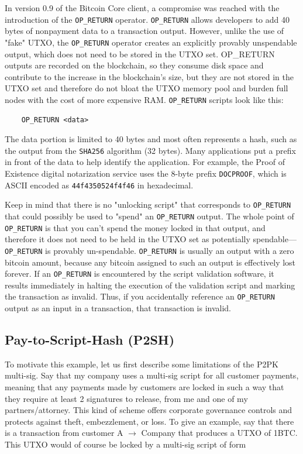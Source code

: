 \documentclass{article}
\newcounter{example}[section]
\newcounter{algo}[section]
\newcounter{code}[section]
\begin{document}
    In version 0.9 of the Bitcoin Core client, a compromise was reached with the introduction of the \texttt{OP\_RETURN} operator. \texttt{OP\_RETURN} allows developers to add 40 bytes of nonpayment data to a transaction output. However, unlike the use of "fake" UTXO, the \texttt{OP\_RETURN} operator creates an explicitly provably unspendable output, which does not need to be stored in the UTXO set. OP\_RETURN outputs are recorded on the blockchain, so they consume disk space and contribute to the increase in the blockchain's size, but they are not stored in the UTXO set and therefore do not bloat the UTXO memory pool and burden full nodes with the cost of more expensive RAM. \texttt{OP\_RETURN} scripts look like this:

    \begin{lstlisting}
    OP_RETURN <data>
    \end{lstlisting}

    The data portion is limited to 40 bytes and most often represents a hash, such as the output from the \texttt{SHA256} algorithm (32 bytes). Many applications put a prefix in front of the data to help identify the application. For example, the Proof of Existence digital notarization service uses the 8-byte prefix \texttt{DOCPROOF}, which is ASCII encoded as \texttt{44f4350524f4f46} in hexadecimal.

    Keep in mind that there is no "unlocking script" that corresponds to \texttt{OP\_RETURN} that could possibly be used to "spend" an \texttt{OP\_RETURN} output. The whole point of \texttt{OP\_RETURN} is that you can't spend the money locked in that output, and therefore it does not need to be held in the UTXO set as potentially spendable—\texttt{OP\_RETURN} is provably un-spendable. \texttt{OP\_RETURN} is usually an output with a zero bitcoin amount, because any bitcoin assigned to such an output is effectively lost forever. If an \texttt{OP\_RETURN} is encountered by the script validation software, it results immediately in halting the execution of the validation script and marking the transaction as invalid. Thus, if you accidentally reference an \texttt{OP\_RETURN} output as an input in a transaction, that transaction is invalid.

  \subsection{Pay-to-Script-Hash (P2SH)}

    To motivate this example, let us first describe some limitations of the P2PK multi-sig. Say that my company uses a multi-sig script for all customer payments, meaning that any payments made by customers are locked in such a way that they require at least 2 signatures to release, from me and one of my partners/attorney. This kind of scheme offers corporate governance controls and protects against theft, embezzlement, or loss. To give an example, say that there is a transaction from customer A $\rightarrow$ Company that produces a UTXO of 1BTC. This UTXO would of course be locked by a multi-sig script of form
\end{document}
